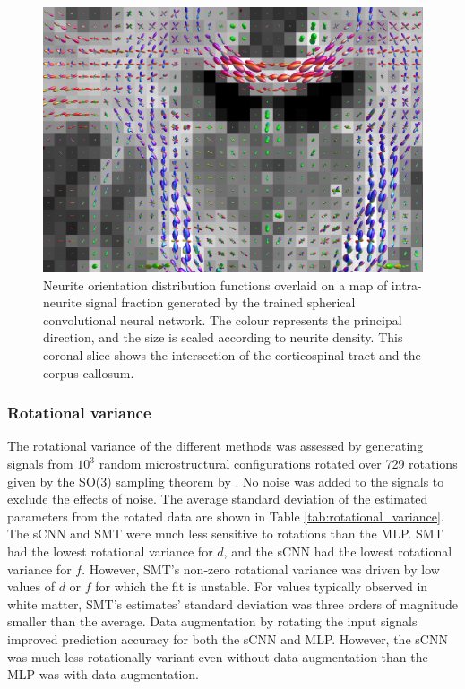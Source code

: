 \documentclass[10pt, letterpaper, oneside]{article}
\begin{document}
\begin{figure}
  \centering
  \includegraphics[width=.99\linewidth]{figures/odfs.png}
  \caption{Neurite orientation distribution functions overlaid on a map of intra-neurite signal fraction generated by the trained spherical convolutional neural network. The colour represents the principal direction, and the size is scaled according to neurite density. This coronal slice shows the intersection of the corticospinal tract and the corpus callosum.}
  \label{fig:odfs}
\end{figure}

\FloatBarrier

\subsubsection{Rotational variance}

The rotational variance of the different methods was assessed by generating signals from $10^3$ random microstructural configurations rotated over 729 rotations given by the SO(3) sampling theorem by \cite{kostelec2008ffts}. No noise was added to the signals to exclude the effects of noise. The average standard deviation of the estimated parameters from the rotated data are shown in Table \ref{tab:rotational_variance}. The sCNN and SMT were much less sensitive to rotations than the MLP. SMT had the lowest rotational variance for $d$, and the sCNN had the lowest rotational variance for $f$. However, SMT's non-zero rotational variance was driven by low values of $d$ or $f$ for which the fit is unstable. For values typically observed in white matter, SMT's estimates' standard deviation was three orders of magnitude smaller than the average. Data augmentation by rotating the input signals improved prediction accuracy for both the sCNN and MLP. However, the sCNN was much less rotationally variant even without data augmentation than the MLP was with data augmentation.
\end{document}
